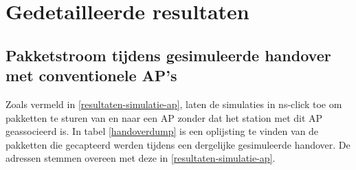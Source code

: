 \chapter{Gedetailleerde resultaten}
\label{details}

\section{Pakketstroom tijdens gesimuleerde handover met conventionele AP's}
\label{details-pakketstroom}

\npar Zoals vermeld in \ref{resultaten-simulatie-ap}, laten de simulaties in ns-click toe om pakketten te sturen van en naar een AP zonder dat het station met dit AP geassocieerd is.  In tabel \ref{handoverdump} is een oplijsting te vinden van de pakketten die gecapteerd werden tijdens een dergelijke gesimuleerde handover.  De adressen stemmen overeen met deze in \ref{resultaten-simulatie-ap}.

